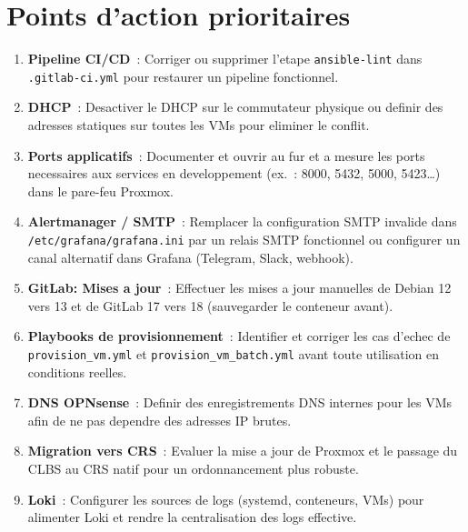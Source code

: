 \documentclass[a4paper,11pt]{article}
\begin{document}
\section{Points d'action prioritaires}

\begin{enumerate}
  \item \textbf{Pipeline CI/CD}~: Corriger ou supprimer l'etape \texttt{ansible-lint}
        dans \texttt{.gitlab-ci.yml} pour restaurer un pipeline fonctionnel.

  \item \textbf{DHCP}~: Desactiver le DHCP sur le commutateur physique ou definir
        des adresses statiques sur toutes les VMs pour eliminer le conflit.

  \item \textbf{Ports applicatifs}~: Documenter et ouvrir au fur et a mesure les
        ports necessaires aux services en developpement (ex.~: 8000, 5432, 5000, 5423\ldots)
        dans le pare-feu Proxmox.

  \item \textbf{Alertmanager / SMTP}~: Remplacer la configuration SMTP invalide
        dans \texttt{/etc/grafana/grafana.ini} par un relais SMTP fonctionnel
        ou configurer un canal alternatif dans Grafana (Telegram, Slack, webhook).

  \item \textbf{GitLab: Mises a jour}~: Effectuer les mises a jour manuelles
        de Debian 12 vers 13 et de GitLab 17 vers 18 (sauvegarder le conteneur avant).

  \item \textbf{Playbooks de provisionnement}~: Identifier et corriger les cas
        d'echec de \texttt{provision\_vm.yml} et \texttt{provision\_vm\_batch.yml}
        avant toute utilisation en conditions reelles.

  \item \textbf{DNS OPNsense}~: Definir des enregistrements DNS internes pour
        les VMs afin de ne pas dependre des adresses IP brutes.

  \item \textbf{Migration vers CRS}~: Evaluer la mise a jour de Proxmox et le
        passage du CLBS au CRS natif pour un ordonnancement plus robuste.

  \item \textbf{Loki}~: Configurer les sources de logs (systemd, conteneurs, VMs)
        pour alimenter Loki et rendre la centralisation des logs effective.
\end{enumerate}
\end{document}

